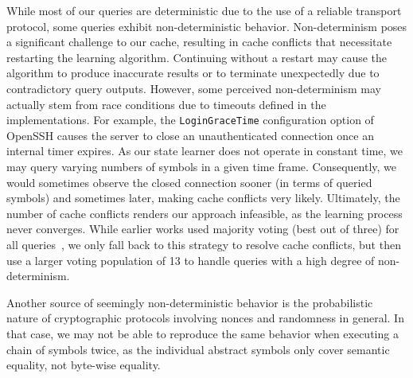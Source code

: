 While most of our queries are deterministic due to the use of a reliable transport protocol, some queries exhibit non-deterministic behavior. Non-determinism poses a significant challenge to our cache, resulting in cache conflicts that necessitate restarting the learning algorithm. Continuing without a restart may cause the algorithm to produce inaccurate results or to terminate unexpectedly due to contradictory query outputs. However, some perceived non-determinism may actually stem from race conditions due to timeouts defined in the implementations. For example, the \texttt{LoginGraceTime} configuration option of OpenSSH causes the server to close an unauthenticated connection once an internal timer expires. As our state learner does not operate in constant time, we may query varying numbers of symbols in a given time frame. Consequently, we would sometimes observe the closed connection sooner (in terms of queried symbols) and sometimes later, making cache conflicts very likely. Ultimately, the number of cache conflicts renders our approach infeasible, as the learning process never converges. While earlier works used majority voting (best out of three) for all queries~\cite{CCS:HKICB21,NSDI:MHYBBSWYZ19}, we only fall back to this strategy to resolve cache conflicts, but then use a larger voting population of 13 to handle queries with a high degree of non-determinism.

Another source of seemingly non-deterministic behavior is the probabilistic nature of cryptographic protocols involving nonces and randomness in general. In that case, we may not be able to reproduce the same behavior when executing a chain of symbols twice, as the individual abstract symbols only cover semantic equality, not byte-wise equality.
